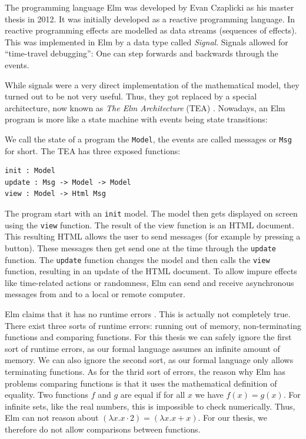 \documentclass[]{scrbook}
\theoremstyle{definition}
\theoremstyle{definition}
\theoremstyle{definition}
\theoremstyle{remark}
\begin{document}
The programming language Elm was developed by Evan Czaplicki as his
master thesis \autocite{elm} in 2012. It was initially developed as a
reactive programming language. In reactive programming effects are
modelled as data streams (sequences of effects). This was implemented in
Elm by a data type called \emph{Signal}. Signals allowed for
\enquote{time-travel debugging}: One can step forwards and backwards
through the events.

While signals were a very direct implementation of the mathematical
model, they turned out to be not very useful. Thus, they got replaced by
a special architecture, now known as \emph{The Elm Architecture} (TEA)
\autocite{ElmPage}. Nowadays, an Elm program is more like a state
machine with events being state transitions:

We call the state of a program the \texttt{Model}, the events are called
messages or \texttt{Msg} for short. The TEA has three exposed functions:

\begin{verbatim}
init : Model
update : Msg -> Model -> Model
view : Model -> Html Msg
\end{verbatim}

The program start with an \texttt{init} model. The model then gets
displayed on screen using the \texttt{view} function. The result of the
view function is an HTML document. This resulting HTML allows the user
to send messages (for example by pressing a button). These messages then
get send one at the time through the \texttt{update} function. The
\texttt{update} function changes the model and then calls the
\texttt{view} function, resulting in an update of the HTML document. To
allow impure effects like time-related actions or randomness, Elm can
send and receive asynchronous messages from and to a local or remote
computer.

Elm claims that it has no runtime errors \autocite{ElmPage}. This is
actually not completely true. There exist three sorts of runtime errors:
running out of memory, non-terminating functions and comparing
functions. For this thesis we can safely ignore the first sort of
runtime errors, as our formal language assumes an infinite amount of
memory. We can also ignore the second sort, as our formal language only
allows terminating functions. As for the thrid sort of errors, the
reason why Elm has problems comparing functions is that it uses the
mathematical definition of equality. Two functions \(f\) and \(g\) are
equal if for all \(x\) we have \(f(x) = g(x)\). For infinite sets, like
the real numbers, this is impossible to check numerically. Thus, Elm can
not reason about \((\lambda x. x\cdot 2) = (\lambda x. x + x)\). For our
thesis, we therefore do not allow comparisons between functions.
\end{document}
